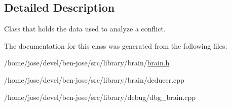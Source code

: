 \subsection{Detailed Description}
Class that holds the data used to analyze a conflict. 

The documentation for this class was generated from the following files\+:\begin{DoxyCompactItemize}
\item 
/home/jose/devel/ben-\/jose/src/library/brain/\hyperlink{brain_8h}{brain.\+h}\item 
/home/jose/devel/ben-\/jose/src/library/brain/deducer.\+cpp\item 
/home/jose/devel/ben-\/jose/src/library/debug/dbg\+\_\+brain.\+cpp\end{DoxyCompactItemize}
